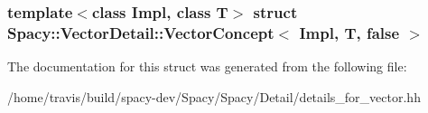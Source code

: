 \subsubsection*{template$<$class Impl, class T$>$ struct Spacy\-::\-Vector\-Detail\-::\-Vector\-Concept$<$ Impl, T, false $>$}



\-The documentation for this struct was generated from the following file\-:\begin{DoxyCompactItemize}
\item 
/home/travis/build/spacy-\/dev/\-Spacy/\-Spacy/\-Detail/details\-\_\-for\-\_\-vector.\-hh\end{DoxyCompactItemize}
